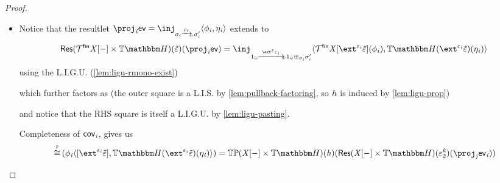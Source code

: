 \begin{proof}
\begin{itemize}
        \item Notice that the resultlet $\proj_\vi \ev = \inj_{\sigma_\vi \xato{\rho_\vi} \sigma_\vi'} \pair{\phi_\vi}{\mvarM_\vi}$ extends to
            \[ 
                \typeRes(\monFLSFin\vX\anyL\dash \times \theapF)(\tilde\me)(\proj_\vi \ev) = 
                    \inj_{\inclITI{\hat\vw} \xato{\ext^{\tilde\me}\me_\vi} {\inclITI{\hat\vw} \liplus{\sigma_\vi} \sigma_\vi'}}
                        \pair{\monFLSFin\vX\anyL{\ext^{\me_\vi}{\tilde\me}}(\phi_\vi)}{\theapF(\ext^{\me_\vi}{\tilde\me})(\mvarM_\vi)}
            \]
            using the L.I.G.U. (\cref{lem:ligu-rmono-exist})

            which further factors as (the outer square is a L.I.S. by \cref{lem:pullback-factoring}, so $\mathit{h}$ is induced by \cref{lem:ligu-prop})
            \begin{center}
            \end{center}
            and notice that the RHS square is itself a L.I.G.U. by \cref{lem:ligu-pasting}.

            Completeness of $\mathsf{cov}_{\mathit{i}}$, gives us
            \[ \hmonIso(\phi_\vi\pair{\anyL{\ext^{\me_\vi}{\tilde\me}}}{\theapF(\ext^{\me_\vi}{\tilde\me})(\mvarM_\vi)}) =
                        \thideMon(\vX\anyL\dash \times \theapF)(\vh)(\typeRes(\vX\anyL\dash \times \theapF)(\me^\vk_2)(\proj_\vj \ev_\vi)) \]
    \end{itemize}


\end{proof}
